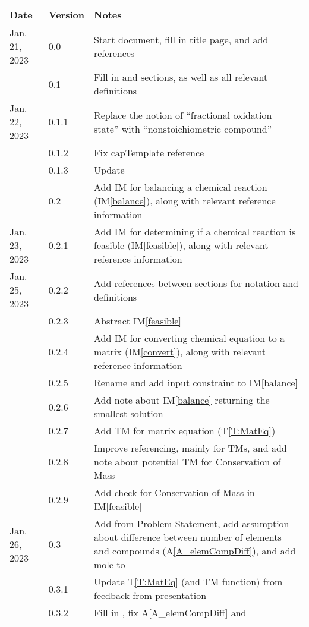 \documentclass[12pt]{article}
\newcommand{\tref}[1]{T\ref{#1}}
\newcommand{\aref}[1]{A\ref{#1}}
\newcommand{\iref}[1]{IM\ref{#1}}
\begin{document}
\begin{tabularx}{\textwidth}{p{2.5cm}p{1.5cm}X}
\toprule {\bf Date} & {\bf Version} & {\bf Notes}\\
\midrule
Jan. 21, 2023 & 0.0 & Start document, fill in title page, and add references\\
							& 0.1 & Fill in \nameref{sec_probDesc} and \nameref{sec_goals} sections, as 
							well as all relevant definitions\\
Jan. 22, 2023 & 0.1.1 & Replace the notion of ``fractional oxidation state'' with
							``nonstoichiometric compound''\\
							& 0.1.2 & Fix capTemplate reference\\
							& 0.1.3 & Update \nameref{sec_abbsAcrs}\\
							& 0.2 & Add IM for balancing a chemical reaction (\iref{balance}), along
							with relevant reference information\\
Jan. 23, 2023 & 0.2.1 & Add IM for determining if a chemical reaction is feasible
							(\iref{feasible}), along with relevant reference information\\
Jan. 25, 2023 & 0.2.2 & Add references between sections for notation and
							definitions\\
							& 0.2.3 & Abstract \iref{feasible}\\
							& 0.2.4 & Add IM for converting chemical equation to a matrix
							(\iref{convert}), along with relevant reference information \\
							& 0.2.5 & Rename and add input constraint to \iref{balance}\\
							& 0.2.6 & Add note about \iref{balance} returning the smallest solution\\
							& 0.2.7 & Add TM for matrix equation (\tref{T:MatEq})\\
							& 0.2.8 & Improve referencing, mainly for TMs, and add note about
							potential TM for Conservation of Mass\\
							& 0.2.9 & Add check for Conservation of Mass in \iref{feasible}\\
Jan. 26, 2023 & 0.3 & Add \nameref{sec_LCs} from Problem Statement, add
							assumption about difference between number of elements and compounds
							(\aref{A_elemCompDiff}), and add mole to \nameref{sec_ToU}\\
							& 0.3.1 & Update \tref{T:MatEq} (and TM function) from feedback from
							presentation\\
							& 0.3.2 & Fill in \nameref{sec_scope}, fix \aref{A_elemCompDiff} and 

\end{tabularx}
\end{document}
